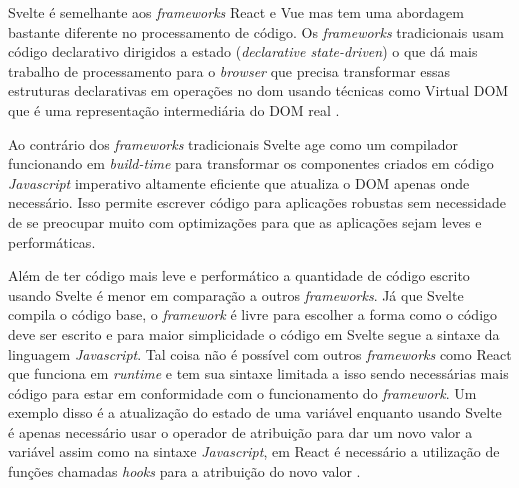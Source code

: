 Svelte é semelhante aos \textit{frameworks} React e Vue mas tem uma abordagem bastante diferente no processamento de código. Os \textit{frameworks} tradicionais usam código declarativo dirigidos a estado (\textit{declarative state-driven}) o que dá mais trabalho de processamento para o \textit{browser} que precisa transformar essas estruturas declarativas em operações no \gls{dom} usando técnicas como Virtual DOM que é uma representação intermediária do DOM real \cite{harris_svelte_2019}.

Ao contrário dos \textit{frameworks} tradicionais Svelte age como um compilador funcionando em \textit{build-time} para transformar os componentes criados em código \textit{Javascript} imperativo altamente eficiente que atualiza o DOM apenas onde necessário. Isso permite escrever código para aplicações robustas sem necessidade de se preocupar muito com optimizações para que as aplicações sejam leves e performáticas.

Além de ter código mais leve e performático a quantidade de código escrito usando Svelte é menor em comparação a outros \textit{frameworks}. Já que Svelte compila o código base, o \textit{framework} é livre para escolher a forma como o código deve ser escrito e para maior simplicidade o código em Svelte segue a sintaxe da linguagem \textit{Javascript}. Tal coisa não é possível com outros \textit{frameworks} como React que funciona em \textit{runtime} e tem sua sintaxe limitada a isso sendo necessárias mais código para estar em conformidade com o funcionamento do \textit{framework}. Um exemplo disso é a atualização do estado de uma variável enquanto usando Svelte é apenas necessário usar o operador de atribuição para dar um novo valor a variável assim como na sintaxe \textit{Javascript}, em React é necessário a utilização de funções chamadas \textit{hooks} para a atribuição do novo valor \cite{harris_write_2019}.